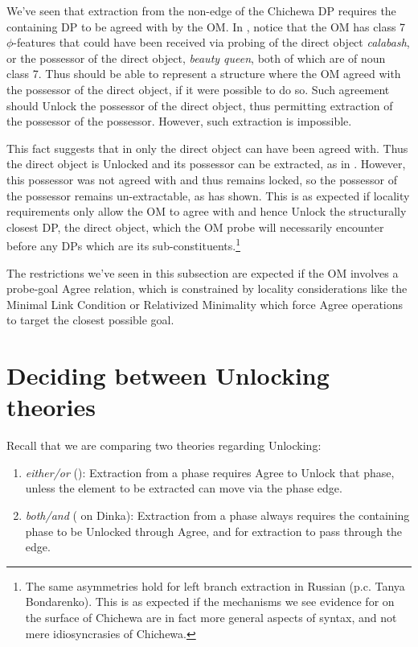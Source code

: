 \documentclass[output=paper,colorlinks,citecolor=brown]{langscibook}
\begin{document}
We've seen that extraction from the non-edge of the Chichewa DP requires the containing DP to be agreed with by the OM. In , notice that the OM has class 7 $\phi$-features that could have been received via probing of the direct object \textit{calabash}, or the possessor of the direct object, \textit{beauty queen}, both of which are of noun class 7. Thus  should be able to represent a structure where the OM agreed with the possessor of the direct object, if it were possible to do so. Such agreement should Unlock the possessor of the direct object, thus permitting extraction of the possessor of the possessor. However, such extraction is impossible.


This fact suggests that in  only the direct object can have been agreed with. Thus the direct object is Unlocked and its possessor can be extracted, as in . However, this possessor was not agreed with and thus remains locked, so the possessor of the possessor remains un-extractable, as  has shown. This is as expected if locality requirements only allow the OM to agree with and hence Unlock the structurally closest DP, the direct object, which the OM probe will necessarily encounter before any DPs which are its sub-constituents.\footnote{The same asymmetries hold for left branch extraction in Russian (p.c. Tanya Bondarenko). This is as expected if the mechanisms we see evidence for on the surface of Chichewa are in fact more general aspects of syntax, and not mere idiosyncrasies of Chichewa.}

The restrictions we've seen in this subsection are expected if the OM involves a probe-goal Agree relation, which is constrained by locality considerations like the Minimal Link Condition \citep{Chomsky1995, Chomsky2000} or Relativized Minimality \citep{Rizzi1990} which force Agree operations to target the closest possible goal.

\section{Deciding between Unlocking theories}\label{sec:branan:4}

 Recall that we are comparing two theories regarding Unlocking:

\begin{enumerate}
	\item \textit{either/or} (\citealt{RackowskiRichards2005, Halpert2016, Halpert2019, Branan2018}): Extraction from a phase requires Agree to Unlock that phase, unless the element to be extracted can move via the phase edge.

    \item \textit{both/and} (\citealt{VanUrkRichards2015} on Dinka): Extraction from a phase always requires the containing phase to be Unlocked through Agree, and for extraction to pass through the edge.
\end{enumerate}
\end{document}
